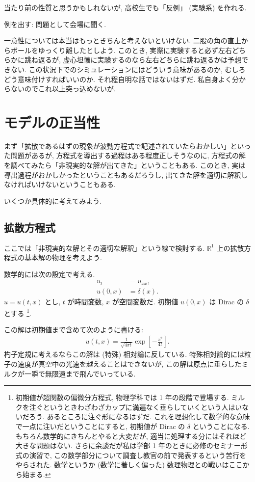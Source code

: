 \documentclass[openany, a4paper, oneside]{book}
\theoremstyle{break}
\theoremstyle{breakdefn}
\begin{document}
当たり前の性質と思うかもしれないが, 高校生でも「反例」 (実験系) を作れる.

例を出す: 問題として会場に聞く.

一意性については本当はもっときちんと考えないといけない.
二股の角の直上からボールをゆっくり離したとしよう.
このとき, 実際に実験すると必ず左右どちらかに跳ね返るが, 虚心坦懐に実験するのなら左右どちらに跳ね返るかは予想できない.
この状況下でのシミュレーションにはどういう意味があるのか, むしろどう意味付けすればいいのか.
それ程自明な話ではないはずだ.
私自身よく分からないのでこれ以上突っ込めないが.
\section{モデルの正当性}
\label{sec-7-9-9}

まず「拡散であるはずの現象が波動方程式で記述されていたらおかしい」といった問題があるが,
方程式を導出する過程はある程度正しそうなのに,
方程式の解を調べてみたら「非現実的な解が出てきた」ということもある.
このとき, 実は導出過程がおかしかったということもあるだろうし,
出てきた解を適切に解釈しなければいけないということもある.

いくつか具体的に考えてみよう.
\subsection{拡散方程式}
\label{sec-7-9-9-1}

ここでは「非現実的な解とその適切な解釈」という線で検討する.
$\mathbb{R}^1$ 上の拡散方程式の基本解の物理を考えよう.

数学的には次の設定で考える.
\begin{align}
 u_t &     = u_{xx}, \\
 u (0, x) & = \delta (x).
\end{align}
$u = u (t,x)$ とし, $t$ が時間変数, $x$ が空間変数だ.
初期値 $u (0, x)$ は Dirac の $\delta$ とする \footnote{初期値が超関数の偏微分方程式, 物理学科では 1 年の段階で登場する.
ミルクを注ぐというときわざわざカップに満遍なく垂らしていくという人はいないだろう.
あるところに注ぐ形になるはずだ.
これを理想化して数学的な意味で一点に注いだということにすると,
初期値が Dirac の $\delta$ ということになる.
もちろん数学的にきちんとやると大変だが, 適当に処理する分にはそれほど大きな問題はない.
さらに余談だが私は学部 1 年のときに必修のセミナー形式の演習で,
この数学部分について調査し教官の前で発表するという苦行をやらされた.
数学というか (数学に著しく偏った) 数理物理との戦いはここから始まる.
 }.

この解は初期値まで含めて次のように書ける:
\begin{align}
 u (t, x) = \frac{1}{\sqrt{4 \pi t}} \exp \left[ - \frac{x^2}{4 t} \right].
\end{align}
杓子定規に考えるならこの解は (特殊) 相対論に反している.
特殊相対論的には粒子の速度が真空中の光速を越えることはできないが,
この解は原点に垂らしたミルクが一瞬で無限遠まで飛んでいっている.
\end{document}
